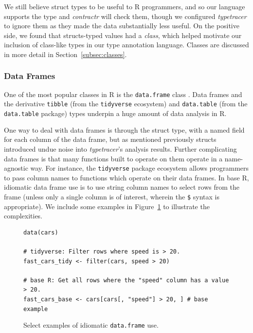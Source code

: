 \documentclass[acmsmall,review,anonymous]{acmart}\settopmatter{printfolios=true,printccs=false,printacmref=false}
\newcommand{\code}[1]{{\lstinline[style=Rin]!#1!}\xspace}
\newcommand{\contractr}{\emph{contractr}\xspace} %
\newcommand{\typetracer}{\emph{typetracer}\xspace} %
\begin{document}
We still believe struct types to be useful to R programmers, and so our
language supports the type and \contractr will check them, though we
configured \typetracer to ignore them as they made the data substantially
less useful.  On the positive side, we found that  structs-typed values had a {\it class}, which helped motivate our
inclusion of class-like types in our type annotation language.  Classes are
discussed in more detail in Section~\ref{subsec:classes}.

%
\subsubsection{Data Frames}

One of the most popular classes in R is the \code{data.frame} class .  Data frames and the derivative \code{tibble}
(from the \code{tidyverse} ecosystem) and \code{data.table} (from the
\code{data.table} package) types underpin a huge amount of data analysis in
R.

One way to deal with data frames is through the struct type, with a named
field for each column of the data frame, but as mentioned previously structs
introduced undue noise into \typetracer's analysis results.  Further
complicating data frames is that many functions built to operate on them
operate in a name-agnostic way.  For instance, the \code{tidyverse} package
ecosystem allows programmers to pass column names to functions which operate
on their data frames.  In base R, idiomatic data frame use is to use string
column names to select rows from the frame (unless only a single column is
of interest, wherein the \code{$} syntax is appropriate).  We include some
examples in Figure~\ref{fig:data-frames-bad} to illustrate the complexities.

\begin{figure}[htbp]
\begin{center}

\begin{lstlisting}
data(cars)

# tidyverse: Filter rows where speed is > 20. 
fast_cars_tidy <- filter(cars, speed > 20)

# base R: Get all rows where the "speed" column has a value > 20.
fast_cars_base <- cars[cars[, "speed"] > 20, ] # base example

\end{lstlisting}

\caption{Select examples of idiomatic \code{data.frame} use.}
\label{fig:data-frames-bad}
\end{center}
\end{figure}
\end{document}
